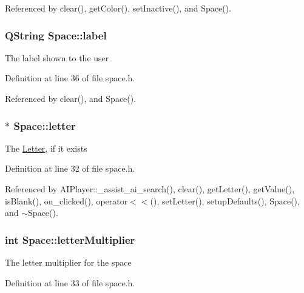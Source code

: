 Referenced by clear(), get\-Color(), set\-Inactive(), and Space().

\hypertarget{class_space_a7e949645659466705ca605a0aef73287}{
\subsubsection[{label}]{\setlength{\rightskip}{0pt plus 5cm}Q\-String Space\-::label\hspace{0.3cm}{\ttfamily [private]}}}\label{class_space_a7e949645659466705ca605a0aef73287}
The label shown to the user 

Definition at line 36 of file space.\-h.



Referenced by clear(), and Space().

\hypertarget{class_space_ab899363fba4ab54c907df80a99e8e563}{
\subsubsection[{letter}]{$\ast$ Space\-::letter\hspace{0.3cm}{\ttfamily [private]}}}\label{class_space_ab899363fba4ab54c907df80a99e8e563}
The \hyperlink{class_letter}{Letter}, if it exists 

Definition at line 32 of file space.\-h.



Referenced by A\-I\-Player\-::\-\_\-assist\-\_\-ai\-\_\-search(), clear(), get\-Letter(), get\-Value(), is\-Blank(), on\-\_\-clicked(), operator$<$$<$(), set\-Letter(), setup\-Defaults(), Space(), and $\sim$\-Space().

\hypertarget{class_space_a9bae20cdb32f38dd2386024db0443b22}{
\subsubsection[{letter\-Multiplier}]{\setlength{\rightskip}{0pt plus 5cm}int Space\-::letter\-Multiplier\hspace{0.3cm}{\ttfamily [private]}}}\label{class_space_a9bae20cdb32f38dd2386024db0443b22}
The letter multiplier for the space 

Definition at line 33 of file space.\-h.



